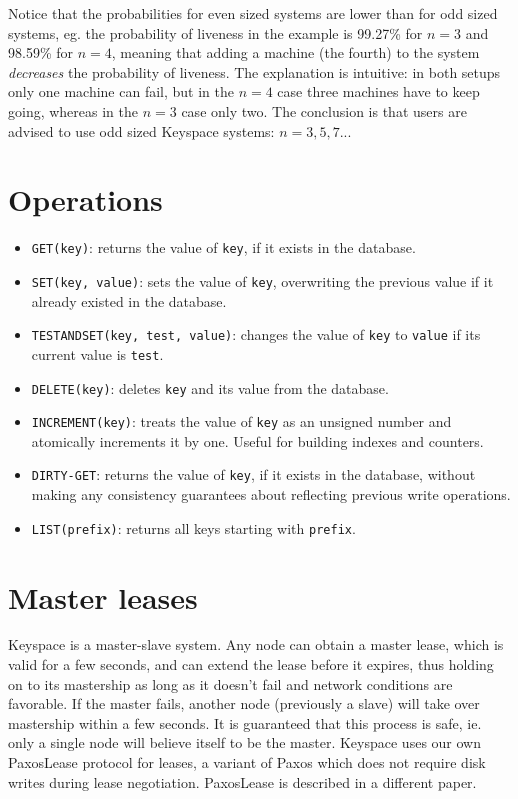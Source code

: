 \documentclass[12pt]{article}
\begin{document}
Notice that the probabilities for even sized systems are lower than for odd sized systems, eg. the probability of liveness in the example is 99.27\% for $n=3$ and 98.59\% for $n=4$, meaning that adding a machine (the fourth) to the system \textit{decreases} the probability of liveness. The explanation is intuitive: in both setups only one machine can fail, but in the $n=4$ case three machines have to keep going, whereas in the $n=3$ case only two. The conclusion is that users are advised to use odd sized Keyspace systems: $n=3, 5, 7...$

\section{ Operations }

\begin{itemize}
\item \texttt{GET(key)}: returns the value of \texttt{key}, if it exists in the database.
\item \texttt{SET(key, value)}: sets the value of \texttt{key}, overwriting the previous value if it already existed in the database.
\item \texttt{TESTANDSET(key, test, value)}: changes the value of \texttt{key} to \texttt{value} if its current value is \texttt{test}.
\item \texttt{DELETE(key)}: deletes \texttt{key} and its value from the database.
\item \texttt{INCREMENT(key)}: treats the value of \texttt{key} as an unsigned number and atomically increments it by one. Useful for building indexes and counters.
\item \texttt{DIRTY-GET}: returns the value of \texttt{key}, if it exists in the database, without making any consistency guarantees about reflecting previous write operations.
\item \texttt{LIST(prefix)}: returns all keys starting with \texttt{prefix}.
\end{itemize}

\section{ Master leases }

Keyspace is a master-slave system. Any node can obtain a master lease, which is valid for a few seconds, and can extend the lease before it expires, thus holding on to its mastership as long as it doesn't fail and network conditions are favorable. If the master fails, another node (previously a slave) will take over mastership within a few seconds. It is guaranteed that this process is safe, ie. only a single node will believe itself to be the master. Keyspace uses our own PaxosLease protocol for leases, a variant of Paxos which does not require disk writes during lease negotiation. PaxosLease is described in a different paper.
\end{document}

